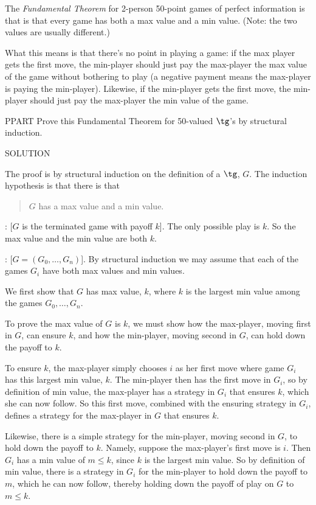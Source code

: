 \begin{definition}
The \emph{Fundamental Theorem} for 2-person 50-point games of perfect
information is that is that every game has both a max value and a min
value.  (Note: the two values are usually different.)

What this means is that there's no point in playing a game: if the max
player gets the first move, the min-player should just pay the max-player
the max value of the game without bothering to play (a negative payment
means the max-player is paying the min-player).  Likewise, if the
min-player gets the first move, the min-player should just pay the
max-player the min value of the game.



PPART\label{finpg} Prove this Fundamental Theorem for 50-valued
$\tg$'s by structural induction.

SOLUTION

The proof is by structural induction on the definition of a
  $\tg$, $G$.  The induction hypothesis is that there is that
\begin{quote}
  $G$ has a max value and a min value.
\end{quote}

: [$G$ is the terminated game with payoff $k$].  The only
possible play is $k$.  So the max value and the min value are both $k$.

: [$G = (G_0,\dots, G_n)$].  By structural
induction we may assume that each of the games $G_i$ have both max values
and min values.

We first show that $G$ has max value, $k$, where $k$ is the largest min
value among the games $G_0,\dots,G_n$.

To prove the max value of $G$ is $k$, we must show how the max-player,
moving first in $G$, can ensure $k$, and how the min-player, moving second
in $G$, can hold down the payoff to $k$.

To ensure $k$, the max-player simply chooses $i$ as her first move where
game $G_i$ has this largest min value, $k$.  The min-player then has the
first move in $G_i$, so by definition of min value, the max-player has a
strategy in $G_i$ that ensures $k$, which she can now follow.  So this
first move, combined with the ensuring strategy in $G_i$, defines a
strategy for the max-player in $G$ that ensures $k$.

Likewise, there is a simple strategy for the min-player, moving second in
$G$, to hold down the payoff to $k$.  Namely, suppose the max-player's
first move is $i$.  Then $G_i$ has a min value of $m \leq k$, since $k$ is
the largest min value.  So by definition of min value, there is a strategy
in $G_i$ for the min-player to hold down the payoff to $m$, which he can
now follow, thereby holding down the payoff of play on $G$ to $m \leq k$.


\end{definition}

